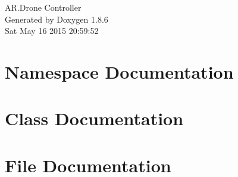 \documentclass[twoside]{book}
\newcommand{\clearemptydoublepage}{%
  \newpage{\pagestyle{empty}\cleardoublepage}%
}
\begin{document}
\hypersetup{pageanchor=false}
\begin{titlepage}
\vspace*{7cm}
\begin{center}%
{\Large A\-R.\-Drone Controller }\\
\vspace*{1cm}
{\large Generated by Doxygen 1.8.6}\\
\vspace*{0.5cm}
{\small Sat May 16 2015 20:59:52}\\
\end{center}
\end{titlepage}
\clearemptydoublepage
\tableofcontents
\clearemptydoublepage
{}
\hypersetup{pageanchor=true}

\chapter{Namespace Documentation}








\chapter{Class Documentation}












\chapter{File Documentation}









\newpage
{}
{}
\printindex
\end{document}

